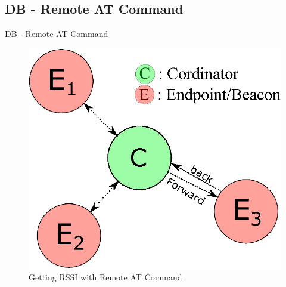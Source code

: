 \documentclass{beamer}
\begin{document}

\subsection{DB - Remote AT Command}
\begin{frame}{DB - Remote AT Command}
    \begin{figure}
    \centering
    \includegraphics[scale=.6]{figs/inkscape/XBeeRemoteDiagram}
    \caption{Getting RSSI with Remote AT Command}
    \label{fig:RSSIRemoteAT}
\end{figure}
\end{frame}


\end{document}
